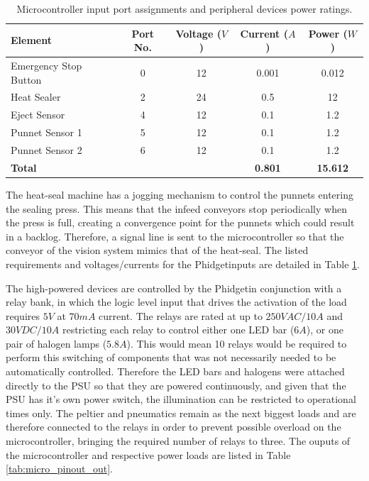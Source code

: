 \documentclass[fleqn,twoside]{article}
\begin{document}
\renewcommand{\arraystretch}{0.8}%
\begin{table}[h]
	\caption{Microcontroller input port assignments and peripheral devices power ratings.}
	\label{tab:micro_pinout_in}
	\begin{tabularx}{\linewidth}{Xcccc}
		
		\toprule
		\textbf{Element}  & \textbf{Port No.} & \textbf{Voltage ($V$)} & \textbf{Current ($A$)} & \textbf{Power ($W$)}\\[8pt]
		\midrule
		Emergency Stop Button 	& 0 & 12 & 0.001 & 0.012  \\[4pt]
		\midrule
		Heat Sealer 			& 2 & 24 & 0.5 & 12 \\[4pt]
		\midrule
		Eject Sensor 			& 4 & 12 & 0.1 & 1.2  \\[4pt]
		\midrule
		Punnet Sensor 1 		& 5 & 12 & 0.1 & 1.2 \\[4pt]
		\midrule
		Punnet Sensor 2 		& 6 & 12 & 0.1 & 1.2  \\[4pt]
		\midrule
		\textbf{Total} 			&   &    & \textbf{0.801} & \textbf{15.612} \\[4pt]
		\bottomrule
		
	\end{tabularx}
\end{table}


The heat-seal machine has a jogging mechanism to control the punnets entering the sealing press. This means that the infeed conveyors stop periodically when the press is full, creating a convergence point for the punnets which could result in a backlog. Therefore, a signal line is sent to the microcontroller so that the conveyor of the vision system mimics that of the heat-seal. The listed requirements and voltages/currents for the Phidget\texttrademark inputs are detailed in Table \ref{tab:micro_pinout_in}.

The high-powered devices are controlled by the Phidget\texttrademark in conjunction with a relay bank, in which the logic level input that drives the activation of the load requires $5V$ at $70mA$ current. The relays are rated at up to $250VAC/10A$ and $30VDC/10A$ restricting each relay to control either one LED bar ($6A$), or one pair of halogen lamps ($5.8A$). This would mean 10 relays would be required to perform this switching of components that was not necessarily needed to be automatically controlled. Therefore the LED bars and halogens were attached directly to the PSU so that they are powered continuously, and given that the PSU has it's own power switch, the illumination can be restricted to operational times only. The peltier and pneumatics remain as the next biggest loads and are therefore connected to the relays in order to prevent possible overload on the microcontroller, bringing the required number of relays to three. The ouputs of the microcontroller and respective power loads are listed in Table \ref{tab:micro_pinout_out}.
\end{document}
